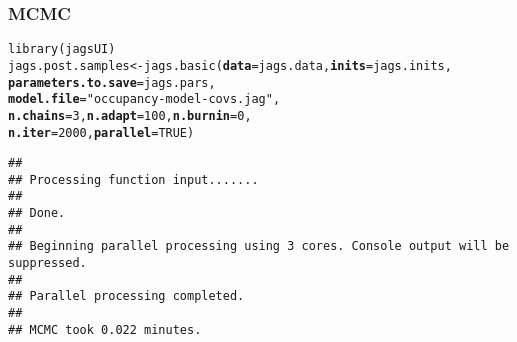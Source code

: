 \documentclass[color=usenames,dvipsnames]{beamer}\usepackage[]{graphicx}\usepackage[]{color}
\makeatletter
\newcommand{\hlnum}[1]{\textcolor[rgb]{0.69,0.494,0}{#1}}%
\newcommand{\hlstr}[1]{\textcolor[rgb]{0.749,0.012,0.012}{#1}}%
\newcommand{\hlstd}[1]{\textcolor[rgb]{0,0,0}{#1}}%
\newcommand{\hlkwb}[1]{\textcolor[rgb]{0,0.341,0.682}{#1}}%
\newcommand{\hlkwc}[1]{\textcolor[rgb]{0,0,0}{\textbf{#1}}}%
\newcommand{\hlkwd}[1]{\textcolor[rgb]{0.004,0.004,0.506}{#1}}%
\newenvironment{kframe}{%
 \def\at@end@of@kframe{}%
 \ifinner\ifhmode%
  \def\at@end@of@kframe{\end{minipage}}%
  \begin{minipage}{\columnwidth}%
 \fi\fi%
 \def\FrameCommand##1{\hskip\@totalleftmargin \hskip-\fboxsep
 \colorbox{shadecolor}{##1}\hskip-\fboxsep
     \hskip-\linewidth \hskip-\@totalleftmargin \hskip\columnwidth}%
 \MakeFramed {\advance\hsize-\width
   \@totalleftmargin\z@ \linewidth\hsize
   \@setminipage}}%
 {\par\unskip\endMakeFramed%
 \at@end@of@kframe}
\newenvironment{knitrout}{}{} %
\makeatother
\begin{document}
\begin{frame}[fragile]
  \frametitle{MCMC}
  \small
\begin{knitrout}\scriptsize
{}\color{fgcolor}\begin{kframe}
\begin{alltt}
\hlkwd{library}\hlstd{(jagsUI)}
\hlstd{jags.post.samples} \hlkwb{<-} \hlkwd{jags.basic}\hlstd{(}\hlkwc{data}\hlstd{=jags.data,} \hlkwc{inits}\hlstd{=jags.inits,}
                                \hlkwc{parameters.to.save}\hlstd{=jags.pars,}
                                \hlkwc{model.file}\hlstd{=}\hlstr{"occupancy-model-covs.jag"}\hlstd{,}
                                \hlkwc{n.chains}\hlstd{=}\hlnum{3}\hlstd{,} \hlkwc{n.adapt}\hlstd{=}\hlnum{100}\hlstd{,} \hlkwc{n.burnin}\hlstd{=}\hlnum{0}\hlstd{,}
                                \hlkwc{n.iter}\hlstd{=}\hlnum{2000}\hlstd{,} \hlkwc{parallel}\hlstd{=}\hlnum{TRUE}\hlstd{)}
\end{alltt}
\begin{verbatim}
## 
## Processing function input....... 
## 
## Done. 
##  
## Beginning parallel processing using 3 cores. Console output will be suppressed.
## 
## Parallel processing completed.
## 
## MCMC took 0.022 minutes.
\end{verbatim}
\end{kframe}
\end{knitrout}
\end{frame}
\end{document}
